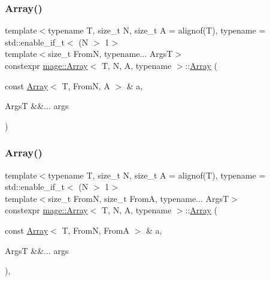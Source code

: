 \subsubsection{\texorpdfstring{Array()}{Array()}\hspace{0.1cm}{\footnotesize\ttfamily [6/10]}}
{\footnotesize\ttfamily template$<$typename T, size\+\_\+t N, size\+\_\+t A = alignof(\+T), typename  = std\+::enable\+\_\+if\+\_\+t$<$ (\+N $>$ 1$>$ \\
template$<$size\+\_\+t FromN, typename... ArgsT$>$ \\
constexpr \mbox{\hyperlink{structmage_1_1_array}{mage\+::\+Array}}$<$ T, N, A, typename $>$\+::\mbox{\hyperlink{structmage_1_1_array}{Array}} (\begin{DoxyParamCaption}\item[{const \mbox{\hyperlink{structmage_1_1_array}{Array}}$<$ T, FromN, A $>$ \&}]{a,  }\item[{ArgsT \&\&...}]{args }\end{DoxyParamCaption})\hspace{0.3cm}{\ttfamily [noexcept]}}

\mbox{\label{structmage_1_1_array_a4952f767cdedb8c2874391dc4d9b74c3}} 
\subsubsection{\texorpdfstring{Array()}{Array()}\hspace{0.1cm}{\footnotesize\ttfamily [7/10]}}
{\footnotesize\ttfamily template$<$typename T, size\+\_\+t N, size\+\_\+t A = alignof(\+T), typename  = std\+::enable\+\_\+if\+\_\+t$<$ (\+N $>$ 1$>$ \\
template$<$size\+\_\+t FromN, size\+\_\+t FromA, typename... ArgsT$>$ \\
constexpr \mbox{\hyperlink{structmage_1_1_array}{mage\+::\+Array}}$<$ T, N, A, typename $>$\+::\mbox{\hyperlink{structmage_1_1_array}{Array}} (\begin{DoxyParamCaption}\item[{const \mbox{\hyperlink{structmage_1_1_array}{Array}}$<$ T, FromN, FromA $>$ \&}]{a,  }\item[{ArgsT \&\&...}]{args }\end{DoxyParamCaption})\hspace{0.3cm}{\ttfamily [explicit]}, {\ttfamily [noexcept]}}

